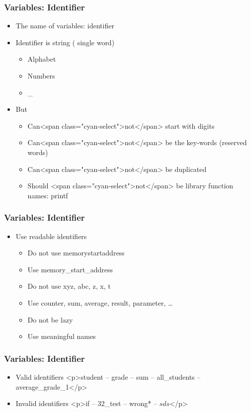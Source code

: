 \documentclass{../c-lecture}
\begin{document}
\begin{frame}
  \frametitle{Variables: Identifier}
  \begin{itemize}
    \item
      The name of variables: {\color{Orange} identifier}
    \item
      Identifier is string ({\color{Green} single word})
    \begin{itemize}
      \item Alphabet
      \item Numbers
      \item _
    \end{itemize}
    \item But
    \begin{itemize}
      \item Can<span class="cyan-select">not</span> start with digits
      \item
        Can<span class="cyan-select">not</span> be the key-words (reserved
        words)
      \item Can<span class="cyan-select">not</span> be duplicated
      \item
        Should <span class="cyan-select">not</span> be library function names:
        printf
    \end{itemize}
  \end{itemize}
\end{frame}

\begin{frame}
  \frametitle{Variables: Identifier}
  \begin{itemize}
    \item Use readable identifiers
    \begin{itemize}
      \item Do not use memorystartaddress
      \item Use memory_start_address
      \item Do not use xyz, abc, z, x, t
      \item Use counter, sum, average, result, parameter, \ldots
      \item Do not be lazy
      \item Use meaningful names
    \end{itemize}
  \end{itemize}
\end{frame}
\begin{frame}
  \frametitle{Variables: Identifier}
  \begin{itemize}
    \item Valid identifiers
    <p>student -- grade -- sum -- all_students -- average_grade_1</p>
    \item Invalid identifiers
    <p>if -- 32_test -- wrong* -- $sds$</p>
  \end{itemize}
\end{frame}
\end{document}
